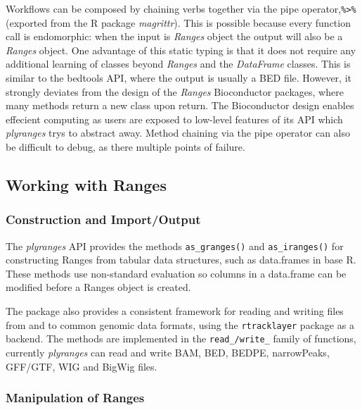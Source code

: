 \documentclass[10pt,letterpaper]{article}
\begin{document}
Workflows can be composed by chaining verbs together via the pipe
operator,\texttt{\%\textgreater{}\%} (exported from the R package
\emph{magrittr}). This is possible because every function call is
endomorphic: when the input is \emph{Ranges} object the output will also
be a \emph{Ranges} object. One advantage of this static typing is that
it does not require any additional learning of classes beyond
\emph{Ranges} and the \emph{DataFrame} classes. This is similar to the
bedtools API, where the output is usually a BED file. However, it
strongly deviates from the design of the \emph{Ranges} Bioconductor
packages, where many methods return a new class upon return. The
Bioconductor design enables effecient computing as users are exposed to
low-level features of its API which \emph{plyranges} trys to abstract
away. Method chaining via the pipe operator can also be difficult to
debug, as there multiple points of failure.

\hypertarget{working-with-ranges}{%
\subsection{Working with Ranges}\label{working-with-ranges}}

\hypertarget{construction-and-importoutput}{%
\subsubsection{Construction and
Import/Output}\label{construction-and-importoutput}}

The \emph{plyranges} API provides the methods \texttt{as\_granges()} and
\texttt{as\_iranges()} for constructing Ranges from tabular data
structures, such as data.frames in base R. These methods use
non-standard evaluation so columns in a data.frame can be modified
before a Ranges object is created.

The package also provides a consistent framework for reading and writing
files from and to common genomic data formats, using the
\texttt{rtracklayer} package as a backend. The methods are implemented
in the \texttt{read\_/write\_} family of functions, currently
\emph{plyranges} can read and write BAM, BED, BEDPE, narrowPeaks,
GFF/GTF, WIG and BigWig files.

\hypertarget{manipulation-of-ranges}{%
\subsubsection{Manipulation of Ranges}\label{manipulation-of-ranges}}
\end{document}
